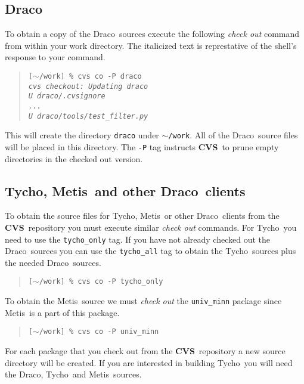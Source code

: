 \documentclass[10pt]{nmemo}
\newcommand{\comp}[1]{\normalfont\normalsize\texttt{#1}}
\newcommand{\draco}{{\normalfont\sffamily Draco}}
\newcommand{\tycho}{{\normalfont\sffamily Tycho}}
\newcommand{\metis}{{\normalfont\sffamily Metis}}
\newcommand{\cvs}{{\normalfont\bfseries CVS}}
\begin{document}
\subsection{\draco}

To obtain a copy of the \draco\ sources execute the following
\emph{check out} command from within your work directory.  The
italicized text is represtative of the shell's response to your
command.

\footnotesize
\begin{verse}
\texttt{[$\sim$/work] \% cvs co -P draco \\
\emph{cvs checkout: Updating draco \\
U draco/.cvsignore \\
      ... \\
U draco/tools/test\_filter.py}}
\end{verse}
\normalsize

This will create the directory \comp{draco} under \comp{$\sim$/work}.  All
of the \draco\ source files will be placed in this directory.  The
\comp{-P} tag instructs \cvs\ to prune empty directories in the
checked out version.  

\subsection{\tycho, \metis\ and other \draco\ clients}

To obtain the source files for \tycho, \metis\ or other \draco\ 
clients from the \cvs\ repository you must execute similar 
\emph{check out} commands.  For \tycho\ you need to use the
\comp{tycho\_only} tag.  If you have not already checked out the
\draco\ sources you can use the \comp{tycho\_all} tag to obtain the
\tycho\ sources plus the needed \draco\ sources.

\footnotesize
\begin{verse}
\texttt{[$\sim$/work] \% cvs co -P tycho\_only}
\end{verse}
\normalsize

To obtain the \metis\ source we must \emph{check out} the
\comp{univ\_minn} package since \metis\ is a part of this package.

\footnotesize
\begin{verse}
\texttt{[$\sim$/work] \% cvs co -P univ\_minn}
\end{verse}
\normalsize

For each package that you check out from the \cvs\ repository a new
source directory will be created.  If you are interested in building
\tycho\ you will need the \draco, \tycho\ and \metis\ sources.
\end{document}
